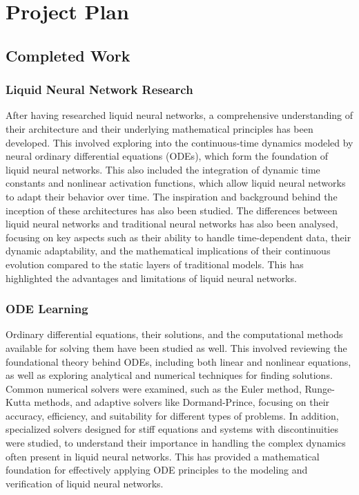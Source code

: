 \chapter{Project Plan}

\section{Completed Work}

\subsection*{Liquid Neural Network Research}

After having researched liquid neural networks, a comprehensive understanding of their architecture and their underlying mathematical principles has been developed. This involved exploring into the continuous-time dynamics modeled by neural ordinary differential equations (ODEs), which form the foundation of liquid neural networks. This also included the integration of dynamic time constants and nonlinear activation functions, which allow liquid neural networks to adapt their behavior over time. The inspiration and background behind the inception of these architectures has also been studied. The differences between liquid neural networks and  traditional neural networks has also been analysed, focusing on key aspects such as their ability to handle time-dependent data, their dynamic adaptability, and the mathematical implications of their continuous evolution compared to the static layers of traditional models. This has highlighted the advantages and limitations of liquid neural networks.

\subsection*{ODE Learning}

Ordinary differential equations, their solutions, and the computational methods available for solving them have been studied as well. This involved reviewing the foundational theory behind ODEs, including both linear and nonlinear equations, as well as exploring analytical and numerical techniques for finding solutions. Common numerical solvers were examined, such as the Euler method, Runge-Kutta methods, and adaptive solvers like Dormand-Prince, focusing on their accuracy, efficiency, and suitability for different types of problems. In addition, specialized solvers designed for stiff equations and systems with discontinuities were studied, to understand their importance in handling the complex dynamics often present in liquid neural networks. This has provided a mathematical foundation for effectively applying ODE principles to the modeling and verification of liquid neural networks.

